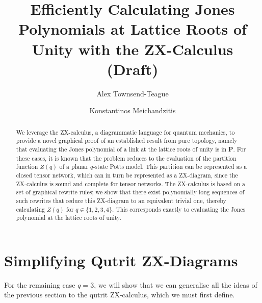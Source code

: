 \documentclass[11pt, oneside]{article}      %
\title{\textbf{Efficiently Calculating Jones Polynomials at Lattice Roots of Unity with the ZX-Calculus (Draft)}}
\author{
  Alex Townsend-Teague
  \and
  Konstantinos Meichandzitis
}
\date{}
\begin{document}
\maketitle
\begin{abstract}
	We leverage the ZX-calculus, a diagrammatic language for quantum mechanics, to provide a novel graphical proof of an established result from pure topology, namely that evaluating the Jones polynomial of a link at the lattice roots of unity is in \textbf{P}. For these cases, it is known that the problem reduces to the evaluation of the partition function $Z(q)$ of a planar $q$-state Potts model. This partition can be represented as a closed tensor network, which can in turn be represented as a ZX-diagram, since the ZX-calculus is sound and complete for tensor networks. The ZX-calculus is based on a set of graphical rewrite rules; we show that there exist polynomially long sequences of such rewrites that reduce this ZX-diagram to an equivalent trivial one, thereby calculating $Z(q)$ for $q \in \{1, 2, 3, 4\}$. This corresponds exactly to evaluating the Jones polynomial at the lattice roots of unity. 

\end{abstract}



%  
 



\section{Simplifying Qutrit ZX-Diagrams}

For the remaining case $q=3$, we will show that we can generalise all the ideas of the previous section to the qutrit ZX-calculus, which we must first define.







\appendix

\end{document}
